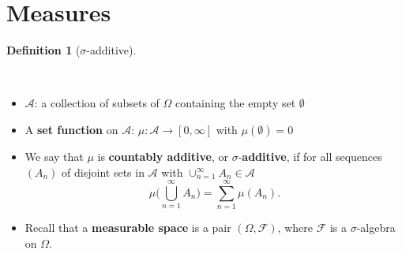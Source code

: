 \documentclass[
  letterpaper,
  DIV=11,
  numbers=noendperiod]{scrreprt}
\providecommand{\tightlist}{%
  \setlength{\itemsep}{0pt}\setlength{\parskip}{0pt}}
\theoremstyle{definition}
\theoremstyle{plain}
\theoremstyle{plain}
\theoremstyle{definition}
\theoremstyle{plain}
\theoremstyle{definition}
\newtheorem{definition}{Definition}[chapter]
\theoremstyle{remark}
\begin{document}
\section{Measures}\label{measures}

\begin{definition}[\(\sigma\)-additive]\protect\hypertarget{def-sigmaadditive}{}\label{def-sigmaadditive}

~

\begin{itemize}
\item
  \(\mathcal{A}\): a collection of subsets of \(\Omega\) containing the
  empty set \(\emptyset\)
\item
  A \textbf{set function} on \(\mathcal{A}\):
  \(\mu : \mathcal{A} \rightarrow [0,\infty]\) with
  \(\mu (\emptyset) = 0\)
\item
  We say that \(\mu\) is \textbf{countably additive}, or
  \(\sigma\)-\textbf{additive}, if for all sequences \((A_n)\) of
  disjoint sets in \(\mathcal{A}\) with
  \(\cup_{n=1}^{\infty}A_n \in \mathcal{A}\) \[
  \mu \Big( \bigcup_{n=1}^{\infty} A_n \Big) = \sum_{n=1}^{\infty}\mu (A_n).
  \]
\end{itemize}

\end{definition}

\begin{tcolorbox}[enhanced jigsaw, left=2mm, arc=.35mm, leftrule=.75mm, colback=white, title=\textcolor{quarto-callout-tip-color}{\faLightbulb}\hspace{0.5em}{Remark}, rightrule=.15mm, breakable, bottomrule=.15mm, coltitle=black, opacitybacktitle=0.6, opacityback=0, toptitle=1mm, titlerule=0mm, toprule=.15mm, colbacktitle=quarto-callout-tip-color!10!white, bottomtitle=1mm, colframe=quarto-callout-tip-color-frame]

\begin{itemize}
\tightlist
\item
  Recall that a \textbf{measurable space} is a pair
  \((\Omega, \mathcal{F})\), where \(\mathcal{F}\) is a
  \(\sigma\)-algebra on \(\Omega\).
\end{itemize}

\end{tcolorbox}
\end{document}
